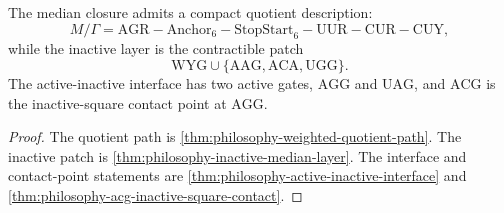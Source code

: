 \begin{theorem}
\label{thm:philosophy-orbit-interface-quotient}
The median closure admits a compact quotient description:
$$
  M/\Gamma
  =
  \mathrm{AGR}
  -
  \mathrm{Anchor}_{6}
  -
  \mathrm{StopStart}_{6}
  -
  \mathrm{UUR}
  -
  \mathrm{CUR}
  -
  \mathrm{CUY},
$$
while the inactive layer is the contractible patch
$$
  \mathrm{WYG}\cup\{\mathrm{AAG},\mathrm{ACA},\mathrm{UGG}\}.
$$
The active-inactive interface has two active gates, $\mathrm{AGG}$ and
$\mathrm{UAG}$, and $\mathrm{ACG}$ is the inactive-square contact point
at $\mathrm{AGG}$.
\end{theorem}
\begin{proof}
The quotient path is \autoref{thm:philosophy-weighted-quotient-path}.
The inactive patch is \autoref{thm:philosophy-inactive-median-layer}.
The interface and contact-point statements are
\autoref{thm:philosophy-active-inactive-interface} and
\autoref{thm:philosophy-acg-inactive-square-contact}.
\end{proof}

